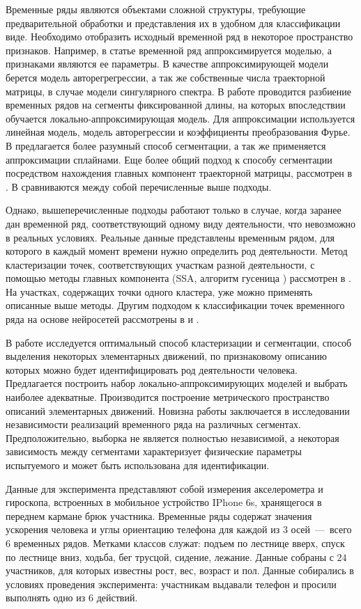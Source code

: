 \documentclass[12pt, twoside]{article}
\begin{document}
Временные ряды являются объектами сложной структуры, требующие предварительной обработки и представления их в удобном для классификации виде. Необходимо отобразить исходный временной ряд в некоторое пространство признаков. Например, в статье \cite{Ivkin15} временной ряд аппроксимируется моделью, а признаками являются ее параметры. В качестве аппроксимирующей модели берется модель авторегрегрессии, а так же собственные числа траекторной матрицы, в случае модели сингулярного спектра. В работе \cite{Karasikov16} проводится разбиение временных рядов на сегменты фиксированной длины, на которых впоследствии обучается локально-аппроксимирующая модель. Для аппроксимации используется линейная модель, модель авторегрессии и коэффициенты преобразования Фурье. В \cite{Anikeev18} предлагается более разумный способ сегментации, а так же применяется аппроксимации сплайнами. Еще более общий подход к способу сегментации посредством нахождения главных компонент траекторной матрицы, рассмотрен в \cite{Motrenko16}. В \cite{Bochkarev18} сравниваются между собой перечисленные выше подходы.

Однако, вышеперечисленные подходы работают только в случае, когда заранее дан временной ряд, соответствующий одному виду деятельности, что невозможно в реальных условиях. Реальные данные представлены временным рядом, для которого в каждый момент времени нужно определить род деятельности. Метод кластеризации точек, соответствующих участкам разной деятельности, с помощью методы главных компонента (SSA, алгоритм гусеница \cite{Danilov97}) рассмотрен в \cite{Grabovoy20}. На участках, содержащих точки одного кластера, уже можно применять описанные выше методы. Другим подходом к классификации точек временного ряда на основе нейросетей рассмотрены в \cite{Dafne19} и \cite{Cinar18}.

В работе исследуется оптимальный способ кластеризации и сегментации, способ выделения некоторых элементарных движений, по признаковому описанию которых можно будет идентифицировать род деятельности человека. Предлагается построить набор локально-аппроксимирующих моделей и выбрать наиболее адекватные. Производится построение метрического пространство описаний элементарных движений. Новизна работы заключается в исследовании независимости реализаций временного ряда на различных сегментах. Предположительно, выборка не является полностью независимой, а некоторая зависимость между сегментами характеризует физические параметры испытуемого и может быть использована для идентификации. 

Данные для эксперимента представляют собой измерения акселерометра и гироскопа, встроенных в мобильное устройство IPhone 6s, хранящегося в переднем кармане брюк участника. Временные ряды содержат значения ускорения человека и углы ориентацию телефона для каждой из $3$ осей~---~всего $6$ временных рядов. Метками классов служат: подъем по лестнице вверх, спуск по лестнице вниз, ходьба, бег трусцой, сидение, лежание. Данные собраны с $24$ участников, для которых известны рост, вес, возраст и пол. Данные собирались в условиях проведения эксперимента: участникам выдавали телефон и просили выполнять одно из $6$ действий.
\end{document}
